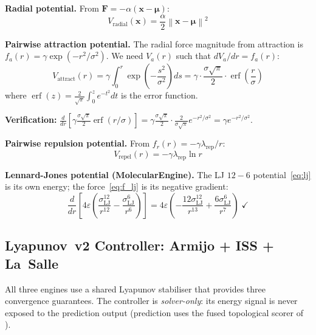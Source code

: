 \documentclass{article}
\newcommand{\norm}[1]{\left\lVert#1\right\rVert}
\DeclareMathOperator{\erf}{erf}
\begin{document}
\textbf{Radial potential.} From $\mathbf{F} = -\alpha(\mathbf{x} - \bm{\mu})$:
\begin{equation}
V_{\text{radial}}(\mathbf{x}) = \frac{\alpha}{2}\norm{\mathbf{x} - \bm{\mu}}^2
\label{eq:v_radial}
\end{equation}

\textbf{Pairwise attraction potential.} The radial force magnitude from attraction is $f_a(r) = \gamma\exp(-r^2/\sigma^2)$. We need $V_a(r)$ such that $dV_a/dr = f_a(r)$:
\begin{equation}
V_{\text{attract}}(r) = \gamma \int_0^r \exp\!\left(-\frac{s^2}{\sigma^2}\right) ds = \gamma \cdot \frac{\sigma\sqrt{\pi}}{2} \cdot \erf\!\left(\frac{r}{\sigma}\right)
\label{eq:v_attract}
\end{equation}
where $\erf(z) = \frac{2}{\sqrt{\pi}}\int_0^z e^{-t^2} dt$ is the error function.

\textbf{Verification:} $\frac{d}{dr}\!\left[\gamma\frac{\sigma\sqrt{\pi}}{2}\erf(r/\sigma)\right] = \gamma\frac{\sigma\sqrt{\pi}}{2} \cdot \frac{2}{\sigma\sqrt{\pi}} e^{-r^2/\sigma^2} = \gamma e^{-r^2/\sigma^2}$. \checkmark

\textbf{Pairwise repulsion potential.} From $f_r(r) = -\gamma\lambda_{\text{rep}}/r$:
\begin{equation}
V_{\text{repel}}(r) = -\gamma\lambda_{\text{rep}} \ln r
\label{eq:v_repel}
\end{equation}

\textbf{Lennard-Jones potential (MolecularEngine).} The LJ $12{-}6$ potential~\eqref{eq:lj} is its own energy; the force~\eqref{eq:f_lj} is its negative gradient:
\begin{equation}
\frac{d}{dr}\left[4\varepsilon\left(\frac{\sigma_{\text{LJ}}^{12}}{r^{12}} - \frac{\sigma_{\text{LJ}}^6}{r^6}\right)\right] = 4\varepsilon\left(-\frac{12\sigma_{\text{LJ}}^{12}}{r^{13}} + \frac{6\sigma_{\text{LJ}}^6}{r^7}\right) \;\checkmark
\end{equation}

\subsection{Lyapunov~v2 Controller: Armijo + ISS + La~Salle}
\label{ssec:lyapunov}

All three engines use a shared Lyapunov stabiliser that provides three convergence guarantees. The controller is \emph{solver-only}: its energy signal is never exposed to the prediction output (prediction uses the fused topological scorer of ).
\end{document}
